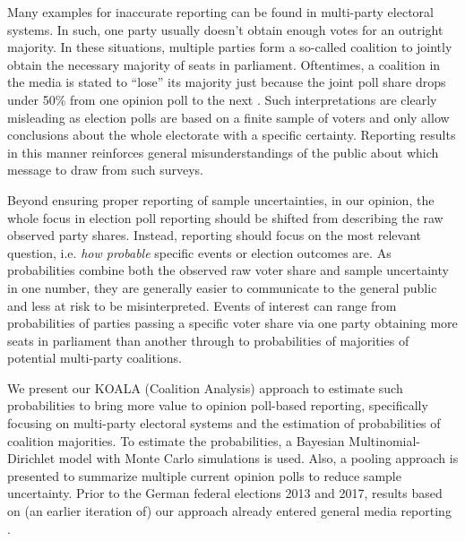 \documentclass[smallcondensed]{svjour3}     %
\begin{document}
Many examples for inaccurate reporting can be found
in multi-party electoral systems.
In such, one party usually doesn't obtain enough votes for an outright majority.
In these situations, multiple parties form a so-called coalition
to jointly obtain the necessary majority of seats in parliament.
Oftentimes, a coalition in the media is stated to ``lose'' its majority
just because the joint poll share drops under 50\% from one opinion poll to
the next \citep[cf.][]{umfrage_2017}.
Such interpretations are clearly misleading as election polls are based on a finite sample
of voters and only allow conclusions about the whole electorate
with a specific certainty. Reporting results in this manner
reinforces general misunderstandings of the public about which message
to draw from such surveys.


Beyond ensuring proper reporting of sample uncertainties, in our opinion, the
whole focus in election poll reporting should be shifted from describing the raw
observed party shares. Instead, reporting should focus on the most relevant
question, i.e. {\it how probable} specific events or election outcomes are.
As probabilities combine both the observed raw voter share
and sample uncertainty in one number, they are generally easier to
communicate to the general public and less at risk to be misinterpreted.
Events of interest can range from probabilities of parties passing
a specific voter share via one party obtaining more seats in parliament
than another through to probabilities of majorities of potential multi-party coalitions.

We present our KOALA (Coalition Analysis) approach to estimate such probabilities
to bring more value to opinion poll-based reporting, specifically focusing on
multi-party electoral systems and the estimation of probabilities of coalition
majorities. To estimate the probabilities, a Bayesian Multinomial-Dirichlet model
with Monte Carlo simulations is used. Also, a pooling approach is presented to summarize
multiple current opinion polls to reduce sample uncertainty.
Prior to the German federal elections 2013 and 2017, results based on (an earlier iteration of)
our approach already entered general media reporting \citep[cf.][]{wahlistik_2013, gelitz_2017}.
\end{document}
